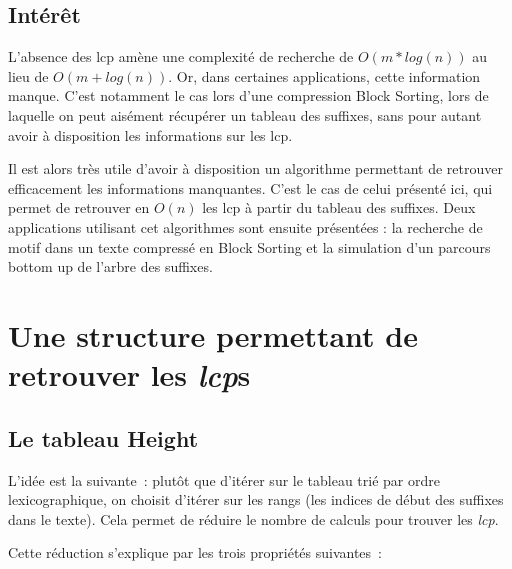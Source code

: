 \documentclass[a4paper,10pt]{article}
\begin{document}
\subsection{Intérêt}
\label{sec:interest}


L'absence des lcp amène une complexité de recherche de $O(m*log(n))$
au lieu de $O(m+log(n))$. Or, dans certaines applications, cette
information manque. C'est notamment le cas lors d'une compression
Block Sorting, lors de laquelle on peut aisément récupérer un tableau
des suffixes, sans pour autant avoir à disposition les informations
sur les lcp.

Il est alors très utile d'avoir à disposition un algorithme permettant
de retrouver efficacement les informations manquantes. C'est le cas de
celui présenté ici, qui permet de retrouver en $O(n)$ les lcp à
partir du tableau des suffixes. Deux applications utilisant cet
algorithmes sont ensuite présentées : la recherche de motif dans un
texte compressé en Block Sorting et la simulation d'un parcours bottom
up de l'arbre des suffixes.


\section{Une structure permettant de retrouver les \textit{lcp}s}
\label{sec:heightstruct}



\subsection{Le tableau Height}
\label{sec:struct}


L'idée est la suivante~: plutôt que d'itérer sur le tableau trié
par ordre lexicographique, on choisit d'itérer sur les rangs (les indices de
début des suffixes dans le texte).
Cela permet de réduire le nombre de calculs pour trouver les \textit{lcp}.

Cette réduction s'explique par les trois propriétés suivantes~:
\end{document}
